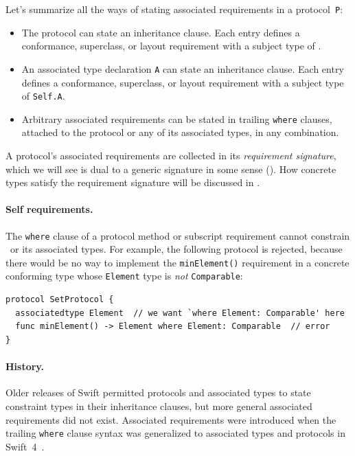 \documentclass[../generics]{subfiles}
\begin{document}
Let's summarize all the ways of stating associated requirements in a protocol~\texttt{P}:
\begin{itemize}
\item The protocol can state an inheritance clause. Each entry defines a conformance, superclass, or layout requirement with a subject type of \tSelf.
\item An associated type declaration \texttt{A} can state an inheritance clause. Each entry defines a conformance, superclass, or layout requirement with a subject type of \texttt{Self.A}.
\item Arbitrary associated requirements can be stated in trailing \texttt{where} clauses, attached to the protocol or any of its associated types, in any combination.
\end{itemize}

A protocol's associated requirements are collected in its \emph{requirement signature}, which we will see is dual to a generic signature in some sense (). How concrete types satisfy the requirement signature will be discussed in .

\paragraph{Self requirements.}
The \texttt{where} clause of a protocol method or subscript requirement cannot constrain \tSelf\ or its associated types. For example, the following protocol is rejected, because there would be no way to implement the \texttt{minElement()} requirement in a concrete conforming type whose \texttt{Element} type is \emph{not} \texttt{Comparable}:
\begin{Verbatim}
protocol SetProtocol {
  associatedtype Element  // we want `where Element: Comparable' here
  func minElement() -> Element where Element: Comparable  // error
}
\end{Verbatim}

\paragraph{History.}
Older releases of Swift permitted protocols and associated types to state constraint types in their inheritance clauses, but more general associated requirements did not exist. Associated requirements were introduced when the trailing \texttt{where} clause syntax was generalized to associated types and protocols in Swift~4~\cite{se0142}.
\end{document}

